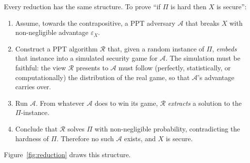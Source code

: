 \documentclass[11pt,a4paper]{article}
\theoremstyle{definition}
\theoremstyle{remark}
\begin{document}
Every reduction has the same structure. To prove ``if \(\Pi\) is hard
then \(X\) is secure'':

\begin{enumerate}
\item Assume, towards the contrapositive, a PPT adversary \(\mathcal{A}\)
  that breaks \(X\) with non-negligible advantage \(\varepsilon_X\).
\item Construct a PPT algorithm \(\mathcal{R}\) that, given a random
  instance of \(\Pi\), \emph{embeds} that instance into a simulated
  security game for \(\mathcal{A}\). The simulation must be faithful:
  the view \(\mathcal{R}\) presents to \(\mathcal{A}\) must follow
  (perfectly, statistically, or computationally) the distribution of
  the real game, so that \(\mathcal{A}\)'s advantage carries over.
\item Run \(\mathcal{A}\). From whatever \(\mathcal{A}\) does to win
  its game, \(\mathcal{R}\) \emph{extracts} a solution to the
  \(\Pi\)-instance.
\item Conclude that \(\mathcal{R}\) solves \(\Pi\) with non-negligible
  probability, contradicting the hardness of \(\Pi\). Therefore no
  such \(\mathcal{A}\) exists, and \(X\) is secure.
\end{enumerate}

Figure~\ref{fig:reduction} draws this structure.
\end{document}
